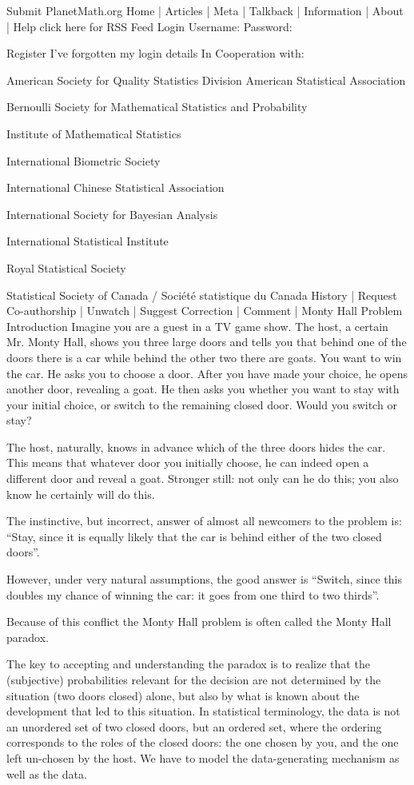 
	Submit
   PlanetMath.org Home |   Articles  |   Meta  |
  Talkback  |   Information  |
  About  |   Help  click here for RSS Feed
Login
Username:	
Password:	

Register
I've forgotten my login details
In Cooperation with:

American Society for Quality Statistics Division 
American Statistical Association 

Bernoulli Society for Mathematical Statistics and Probability 

Institute of Mathematical Statistics 

International Biometric Society 

International Chinese Statistical Association 

International Society for Bayesian Analysis 

International Statistical Institute 

Royal Statistical Society 

Statistical Society of Canada / Société statistique du Canada
History | Request Co-authorship | Unwatch | Suggest Correction | Comment |
Monty Hall Problem
Introduction
Imagine you are a guest in a TV game show. The host, a certain Mr. Monty Hall, shows you three large doors and tells you that behind one of the doors there is a car while behind the other two there are goats. You want to win the car. He asks you to choose a door. After you have made your choice, he opens another door, revealing a goat. He then asks you whether you want to stay with your initial choice, or switch to the remaining closed door. Would you switch or stay?

The host, naturally, knows in advance which of the three doors hides the car. This means that whatever door you initially choose, he can indeed open a different door and reveal a goat. Stronger still: not only can he do this; you also know he certainly will do this.

The instinctive, but incorrect, answer of almost all newcomers to the problem is: ``Stay, since it is equally likely that the car is behind either of the two closed doors''.

However, under very natural assumptions, the good answer is ``Switch, since this doubles my chance of winning the car: it goes from one third to two thirds''.

Because of this conflict the Monty Hall problem is often called the Monty Hall paradox.

The key to accepting and understanding the paradox is to realize that the (subjective) probabilities relevant for the decision are not determined by the situation (two doors closed) alone, but also by what is known about the development that led to this situation. In statistical terminology, the data is not an unordered set of two closed doors, but an ordered set, where the ordering corresponds to the roles of the closed doors: the one chosen by you, and the one left un-chosen by the host. We have to model the data-generating mechanism as well as the data.

